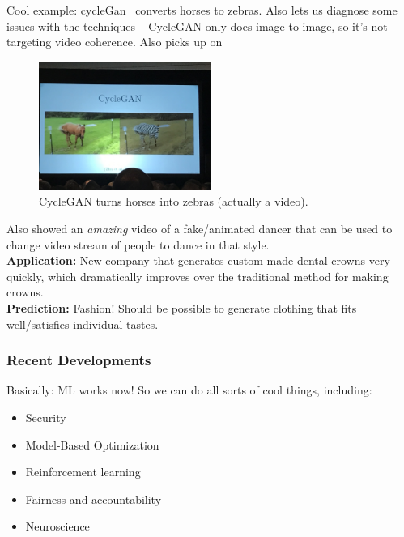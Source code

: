 Cool example: cycleGan~\cite{zhu2017unpaired} converts horses to zebras. Also lets us diagnose some issues with the techniques -- CycleGAN only does image-to-image, so it's not targeting video coherence. Also picks up on 


\begin{figure}[h!]
    \centering
    \includegraphics[width=0.5\textwidth]{images/zebra.JPG}
    \caption{CycleGAN turns horses into zebras (actually a video).}
    \label{fig:zebra}
\end{figure}

Also showed an {\it amazing} video of a fake/animated dancer that can be used to change video stream of people to dance in that style. \\

{\bf Application:} New company that generates custom made dental crowns very quickly, which dramatically improves over the traditional method for making crowns. \\

{\bf Prediction:} Fashion! Should be possible to generate clothing that fits well/satisfies individual tastes. \\

\subsubsection{Recent Developments}

Basically: ML works now! So we can do all sorts of cool things, including:
\begin{itemize}
    \item Security
    \item Model-Based Optimization
    \item Reinforcement learning
    \item Fairness and accountability
    \item Neuroscience
\end{itemize}


